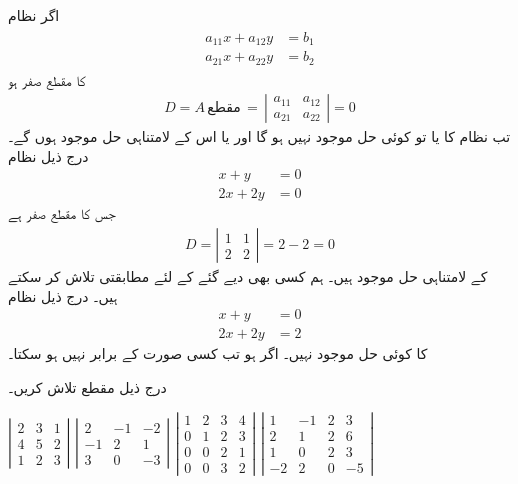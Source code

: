 اگر نظام
\begin{gather}
\begin{aligned}
a_{11}x+a_{12}y&=b_1\\
a_{21}x+a_{22}y&=b_2
\end{aligned}
\end{gather}
 کا مقطع صفر ہو
\begin{align*}
D=A\,\text{مقطع}\,=\,
\left |
\begin{array}{rr}
a_{11}&a_{12}\\
a_{21}&a_{22}
\end{array}
\right |=0
\end{align*}
تب نظام کا یا    تو کوئی حل موجود نہیں ہو گا اور یا اس کے لامتناہی حل موجود ہوں گے۔درج ذیل نظام
\begin{align*}
x+y&=0\\
2x+2y&=0
\end{align*}
جس کا  مقطع صفر ہے
\begin{align*}
D=\left|
\begin{array}{rr}
1&1\\
2&2
\end{array}
 \right|=2-2=0
\end{align*}
کے لامتناہی حل موجود ہیں۔ ہم  کسی بھی دیے گئے  کے لئے  مطابقتی  تلاش کر سکتے ہیں۔ درج ذیل نظام
\begin{align*}
x+y&=0\\
2x+2y&=2
\end{align*}
کا کوئی حل موجود نہیں۔ اگر   ہو تب  کسی صورت  کے برابر نہیں ہو سکتا۔

درج ذیل مقطع تلاش کریں۔

\(
\left |
\begin{array}{rrr}
2&3&1\\
4&5&2\\
1&2&3
\end{array} \right |
\)
\(
\left |
\begin{array}{rrr}
2&-1&-2\\
-1&2&1\\
3&0&-3
\end{array} \right |
\)
\(
\left |
\begin{array}{rrrr}
1&2&3&4\\
0&1&2&3\\
0&0&2&1\\
0&0&3&2
\end{array} \right |
\)
\(
\left |
\begin{array}{rrrr}
1&-1&2&3\\
2&1&2&6\\
1&0&2&3\\
-2&2&0&-5
\end{array} \right |
\)

